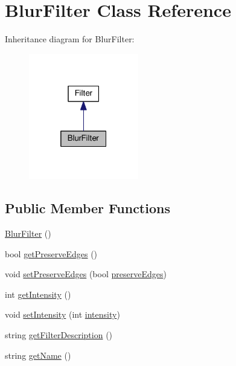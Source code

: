 \hypertarget{classModel_1_1BlurFilter}{}\section{Blur\+Filter Class Reference}
\label{classModel_1_1BlurFilter}


Inheritance diagram for Blur\+Filter\+:
\nopagebreak
\begin{figure}[H]
\begin{center}
\leavevmode
\includegraphics[width=136pt]{classModel_1_1BlurFilter__inherit__graph}
\end{center}
\end{figure}
\subsection*{Public Member Functions}
\begin{DoxyCompactItemize}
\item 
\hyperlink{classModel_1_1BlurFilter_afe4d07071313db8ac2e61b2641051b21}{Blur\+Filter} ()
\item 
bool \hyperlink{classModel_1_1BlurFilter_a0f68baff76107f2b3982df5cca754340}{get\+Preserve\+Edges} ()
\item 
void \hyperlink{classModel_1_1BlurFilter_a87c0326c6cec136fccffeca502d20ede}{set\+Preserve\+Edges} (bool \hyperlink{classModel_1_1BlurFilter_a063a2e7e7a9dbc091f483eeaec61d5e3}{preserve\+Edges})
\item 
int \hyperlink{classModel_1_1BlurFilter_a708995fb1b6acb31ee0dfb0f4881e5b5}{get\+Intensity} ()
\item 
void \hyperlink{classModel_1_1BlurFilter_ac8255ffbc46bb61acaa8fd23d0d260eb}{set\+Intensity} (int \hyperlink{classModel_1_1BlurFilter_a299ec0c42ccc5a2d79d1739428ac3210}{intensity})
\item 
string \hyperlink{classModel_1_1BlurFilter_a62b7b60e24f92234393b840b35808e06}{get\+Filter\+Description} ()
\item 
string \hyperlink{classModel_1_1BlurFilter_a11335e13e50af74108bf926dc1340b4b}{get\+Name} ()
\end{DoxyCompactItemize}
